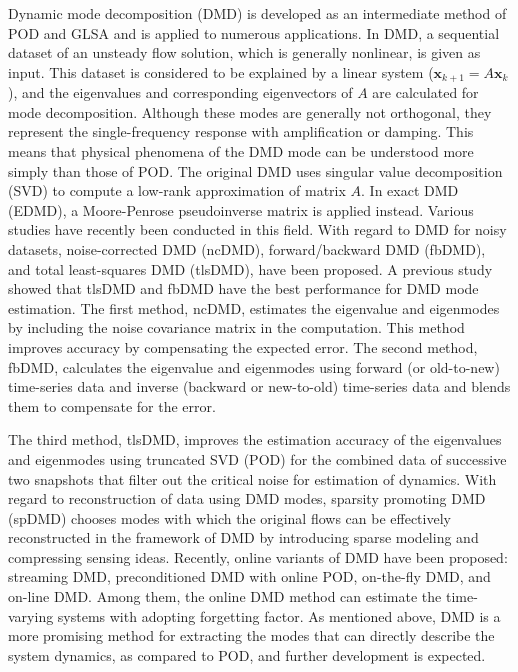 \documentclass[aip,graphicx]{revtex4-1}
\begin{document}
Dynamic mode decomposition (DMD)\cite{Schmid2010} is developed as an intermediate method of POD and GLSA and is applied to numerous applications.\cite{Wang2017,Priebe2016,Ohmichi2017} In DMD, a sequential dataset of an unsteady flow solution, which is generally nonlinear, is given as input. 
This dataset is considered to be explained by a linear system ($\bm{x}_{k+1}=A\bm{x}_k$), and the eigenvalues and corresponding eigenvectors of $A$ are calculated for mode decomposition.
Although these modes are generally not orthogonal, they represent the single-frequency response with amplification or damping.
This means that physical phenomena of the DMD mode can be understood more simply than those of POD.
The original DMD\cite{Schmid2010} uses singular value decomposition (SVD) to compute a low-rank approximation of matrix $A$.
In exact DMD (EDMD), a Moore-Penrose pseudoinverse matrix is applied instead.\cite{Tu2014}
Various studies have recently been conducted in this field. With regard to DMD for noisy datasets, noise-corrected DMD (ncDMD),\cite{Dawson2016} forward/backward DMD (fbDMD),\cite{Dawson2016} and total least-squares DMD (tlsDMD),\cite{Hemati2016,Dawson2016,Hemati2017} have been proposed. A previous study showed that tlsDMD and fbDMD have the best performance for DMD mode estimation. 
The first method, ncDMD, estimates the eigenvalue and eigenmodes by including the noise covariance matrix in the computation. This method improves accuracy by compensating the expected error. 
The second method, fbDMD,\cite{Hemati2016} calculates the eigenvalue and eigenmodes using forward (or old-to-new) time-series data and inverse (backward or new-to-old) time-series data and blends them to compensate for the error. 

The third method, tlsDMD,\cite{Hemati2017} improves the estimation accuracy of the eigenvalues and eigenmodes using truncated SVD (POD) for the combined data of successive two snapshots that filter out the critical noise for estimation of dynamics. 
With regard to reconstruction of data using DMD modes, sparsity promoting DMD (spDMD)\cite{Jovanovic2014} chooses modes with which the original flows can be effectively reconstructed in the framework of DMD by introducing sparse modeling and compressing sensing ideas. 
Recently, online variants of DMD have been proposed: streaming DMD,\cite{Hemati2014} preconditioned DMD with online POD,\cite{Ohmichi2017a} on-the-fly DMD,\cite{Matsumoto2017} and on-line DMD.\cite{Zhang2017}  Among them, the online DMD method can estimate the time-varying systems with adopting forgetting factor.\cite{Zhang2017} As mentioned above, DMD is a more promising method for extracting the modes that can directly describe the system dynamics, as compared to POD, and further development is expected.
\end{document}
